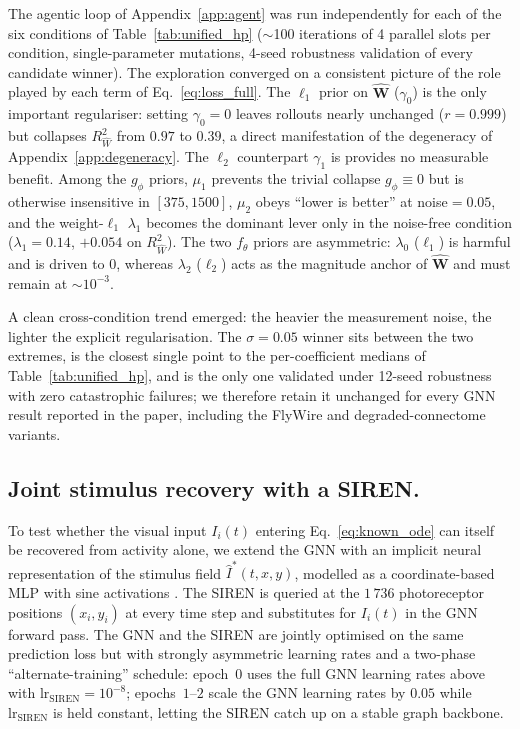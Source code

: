 \documentclass{article}
\begin{document}
The agentic loop of Appendix~\ref{app:agent} was run independently for
each of the six conditions of Table~\ref{tab:unified_hp} ($\sim$100
iterations of 4 parallel slots per condition, single-parameter
mutations, 4-seed robustness validation of every candidate winner).
The exploration converged on a consistent picture of the role played
by each term of Eq.~\ref{eq:loss_full}. The $\ell_1$ prior on $\hat{\mathbf W}$ ($\gamma_0$) is the only important regulariser: setting $\gamma_0\!=\!0$ leaves rollouts
nearly unchanged ($r\!=\!0.999$) but collapses $R^2_{\hat W}$ from
$0.97$ to $0.39$, a direct manifestation of the degeneracy of
Appendix~\ref{app:degeneracy}. The $\ell_2$ counterpart $\gamma_1$ is
provides no measurable benefit. Among the $g_\phi$ priors, $\mu_1$
prevents the trivial collapse $g_\phi\!\equiv\!0$ but is otherwise
insensitive in $[375,1500]$, $\mu_2$ obeys ``lower is better'' at
noise$=0.05$, and the weight-$\ell_1$ $\lambda_1$ becomes the
dominant lever only in the noise-free condition ($\lambda_1\!=\!0.14$,
$+0.054$ on $R^2_{\hat W}$). The two $f_\theta$ priors are
asymmetric: $\lambda_0$ ($\ell_1$) is harmful and is driven to $0$, whereas $\lambda_2$ ($\ell_2$) acts as the magnitude anchor of $\hat{\mathbf W}$ and must remain at
$\sim\!10^{-3}$.

A clean cross-condition trend emerged: the heavier the measurement
noise, the lighter the explicit regularisation. The $\sigma\!=\!0.05$
winner sits between the two extremes, is the closest single point to
the per-coefficient medians of Table~\ref{tab:unified_hp}, and is
the only one validated under 12-seed robustness with zero
catastrophic failures; we therefore retain it unchanged for every
GNN result reported in the paper, including the FlyWire and
degraded-connectome variants.

\subsection{Joint stimulus recovery with a SIREN.}
To test whether the visual input $I_i(t)$ entering
Eq.~\ref{eq:known_ode} can itself be recovered from activity alone,
we extend the GNN with an implicit neural representation of the
stimulus field $\hat I^*(t,x,y)$, modelled as a coordinate-based
MLP with sine activations \citep[SIREN,][input size~$=3$,
hidden dimension~$=2048$, $4$ hidden layers, output size~$=1$,
$\omega_0\!=\!4096$, outermost-linear head]{sitzmann_implicit_2020}.
The SIREN is queried at the $1\,736$ photoreceptor positions
$(x_i,y_i)$ at every time step and substitutes for $I_i(t)$ in the
GNN forward pass. The GNN and the SIREN are jointly optimised on the
same prediction loss but with strongly asymmetric learning rates
and a two-phase ``alternate-training'' schedule: epoch~$0$ uses the
full GNN learning rates above with
$\text{lr}_\text{SIREN}\!=\!10^{-8}$; epochs~$1$–$2$ scale the GNN
learning rates by $0.05$ while $\text{lr}_\text{SIREN}$ is held
constant, letting the SIREN catch up on a stable graph backbone.




\newpage

\end{document}
